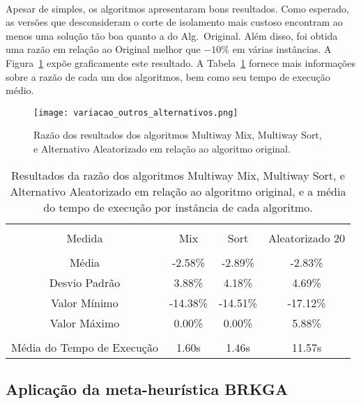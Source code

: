 \documentclass[12pt, a4paper]{article}
\begin{document}
\paragraph{}
Apesar de simples, os algoritmos apresentaram bons resultados. Como esperado, as versões que desconsideram o corte de isolamento mais custoso encontram ao menos uma solução tão boa quanto a do Alg.\ Original. Além disso, foi obtida uma razão em relação ao Original melhor que $-10\%$ em várias instâncias. A Figura~\ref{fig:variacao_outros_alternativos} expõe graficamente este resultado. A Tabela~\ref{tab:resultados_variancia_alg_poli} fornece mais informações sobre a razão de cada um dos algoritmos, bem como seu tempo de execução médio.

\begin{figure}[!htb]
\centering
\texttt{[image: variacao\_outros\_alternativos.png]}
\caption{Razão dos resultados dos algoritmos Multiway Mix, Multiway Sort, e Alternativo Aleatorizado em relação ao algoritmo original.}
\label{fig:variacao_outros_alternativos}
\end{figure}

\begin{table}[ht]
\centering %
\begin{tabular}{c c c c} %
\hline \\[-2ex]
Medida & Mix & Sort & Aleatorizado 20\\ [0.5ex] 
\hline \\[-1.5ex]
Média & -2.58\% & -2.89\% & -2.83\% \\ 
Desvio Padrão & 3.88\% & 4.18\% & 4.69\% \\ 
Valor Mínimo & -14.38\% & -14.51\% & -17.12\%\\ 
Valor Máximo & 0.00\% & 0.00\% & 5.88\% \\ [1ex] %
\hline \\[-2ex]
Média do Tempo de Execução & 1.60s & 1.46s & 11.57s\\ [1ex] 
\hline
\end{tabular}
\caption{Resultados da razão dos algoritmos Multiway Mix, Multiway Sort, e Alternativo Aleatorizado em relação ao algoritmo original, e a média do tempo de execução por instância de cada algoritmo.}
\label{tab:resultados_variancia_alg_poli}
\end{table}

\subsection{Aplicação da meta-heurística BRKGA}
\end{document}
